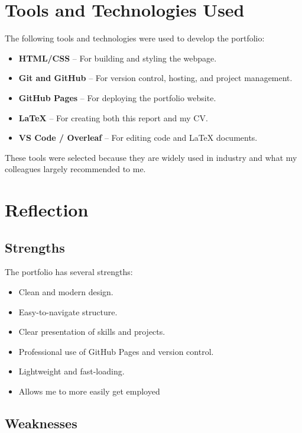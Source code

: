 \documentclass[12pt]{article}
\begin{document}
\section{Tools and Technologies Used}

The following tools and technologies were used to develop the portfolio:

\begin{itemize}
    \item \textbf{HTML/CSS} – For building and styling the webpage.
    \item \textbf{Git and GitHub} – For version control, hosting, and project management.
    \item \textbf{GitHub Pages} – For deploying the portfolio website.
    \item \textbf{LaTeX} – For creating both this report and my CV.
    \item \textbf{VS Code / Overleaf} – For editing code and LaTeX documents.
\end{itemize}

These tools were selected because they are widely used in industry and what my colleagues largely recommended to me.

\section{Reflection}

\subsection*{Strengths}

The portfolio has several strengths:

\begin{itemize}
    \item Clean and modern design.
    \item Easy-to-navigate structure.
    \item Clear presentation of skills and projects.
    \item Professional use of GitHub Pages and version control.
    \item Lightweight and fast-loading.
    \item Allows me to more easily get employed
\end{itemize}

\subsection*{Weaknesses}
\end{document}
